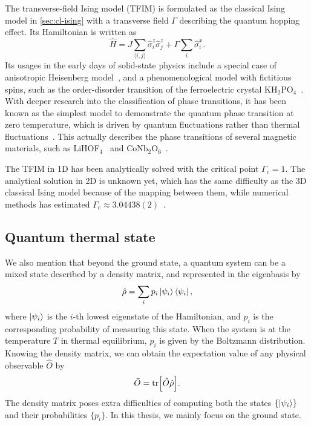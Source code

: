 The transverse-field Ising model (TFIM) is formulated as the classical Ising model in \cref{sec:cl-ising} with a transverse field $\Gamma$ describing the quantum hopping effect. Its Hamiltonian is written as
\begin{equation}
\hat{H} = J \sum_{\langle i, j \rangle} \hat{\sigma}^z_i \hat{\sigma}^z_j
+ \Gamma \sum_i \hat{\sigma}^x_i.
\label{eq:qu-ising}
\end{equation}
Its usages in the early days of solid-state physics include a special case of anisotropic Heisenberg model~\cite{katsura1962statistical}, and a phenomenological model with fictitious spins, such as the order-disorder transition of the ferroelectric crystal KH$_2$PO$_4$~\cite{de1963collective}. With deeper research into the classification of phase transitions, it has been known as the simplest model to demonstrate the quantum phase transition at zero temperature, which is driven by quantum fluctuations rather than thermal fluctuations~\cite{sachdev2001quantum, suzuki2012quantum}. This actually describes the phase transitions of several magnetic materials, such as LiHOF$_4$~\cite{bitko1996quantum} and CoNb$_2$O$_6$~\cite{coldea2010quantum}.

The TFIM in 1D has been analytically solved with the critical point $\Gamma_\text{c} = 1$. The analytical solution in 2D is unknown yet, which has the same difficulty as the 3D classical Ising model because of the mapping between them, while numerical methods has estimated $\Gamma_\text{c} \approx 3.04438(2)$~\cite{blote2002cluster}.

\subsection{Quantum thermal state}

We also mention that beyond the ground state, a quantum system can be a mixed state described by a density matrix, and represented in the eigenbasis by
\begin{equation}
\hat{\rho} = \sum_i p_i \ket{\psi_i}\bra{\psi_i},
\end{equation}
where $\ket{\psi_i}$ is the $i$-th lowest eigenstate of the Hamiltonian, and $p_i$ is the corresponding probability of measuring this state. When the system is at the temperature $T$ in thermal equilibrium, $p_i$ is given by the Boltzmann distribution. Knowing the density matrix, we can obtain the expectation value of any physical observable $\hat{O}$ by
\begin{equation}
\bar{O} = \tr[\hat{O} \hat{\rho}].
\label{eq:dm-obs}
\end{equation}
The density matrix poses extra difficulties of computing both the states $\left\{ \ket{\psi_i} \right\}$ and their probabilities $\{p_i\}$. In this thesis, we mainly focus on the ground state.

